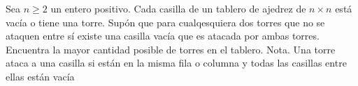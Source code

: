 Sea $n \geq 2$ un entero positivo. Cada casilla de un tablero de ajedrez de $n \times  n$ está vacía o tiene una torre. Supón que para cualqesquiera dos torres que no se ataquen entre sí existe una casilla vacía que es atacada por ambas torres. Encuentra la mayor cantidad posible de torres en el tablero.  \newline 
Nota. Una torre ataca a una casilla si están en la misma fila o columna y todas las casillas entre ellas están vacía